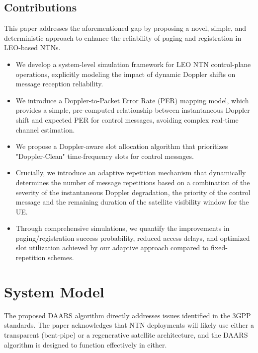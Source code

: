 \documentclass[conference]{IEEEtran}
\begin{document}
\subsection{Contributions}
\label{sec:contributions}
This paper addresses the aforementioned gap by proposing a novel, simple, and deterministic approach to enhance the reliability of paging and registration in LEO-based NTNs. %

\begin{itemize}
    \item[a)] We develop a system-level simulation framework for LEO NTN control-plane operations, explicitly modeling the impact of dynamic Doppler shifts on message reception reliability.
    \item[b)] We introduce a Doppler-to-Packet Error Rate (PER) mapping model, which provides a simple, pre-computed relationship between instantaneous Doppler shift and expected PER for control messages, avoiding complex real-time channel estimation.
    \item[c)] We propose a Doppler-aware slot allocation algorithm that prioritizes "Doppler-Clean" time-frequency slots for control messages.
    \item[d)] Crucially, we introduce an adaptive repetition mechanism that dynamically determines the number of message repetitions based on a combination of the severity of the instantaneous Doppler degradation, the priority of the control message and the remaining duration of the satellite visibility window for the UE.
    \item[e)] Through comprehensive simulations, we quantify the improvements in paging/registration success probability, reduced access delays, and optimized slot utilization achieved by our adaptive approach compared to fixed-repetition schemes.
\end{itemize}


\section{System Model}
\label{sec:system_model}
 The proposed DAARS algorithm directly addresses issues identified in the 3GPP standards. The paper acknowledges that NTN deployments will likely use either a transparent (bent-pipe) or a regenerative satellite architecture, and the DAARS algorithm is designed to function effectively in either.
\end{document}
